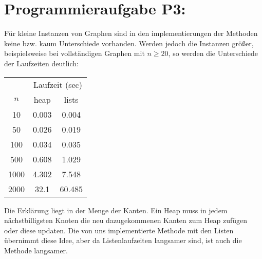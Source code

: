 \documentclass[11pt]{scrartcl} %
\begin{document}
\section*{Programmieraufgabe P3:}
Für kleine Instanzen von Graphen sind in den implementierungen der Methoden keine bzw. kaum Unterschiede vorhanden. Werden jedoch die Instanzen größer, beispielsweise bei vollständigen Graphen mit $n \geq 20$, so werden die Unterschiede der Laufzeiten deutlich:

\begin{minipage}[b]{0.3\textwidth}
\begin{tabular}{c|c|c}
 & \multicolumn{2}{c}{Laufzeit (sec)}\\
$n$ & heap & lists\\
\hline \hline
10 & 0.003 & 0.004 \\
\hline
50 & 0.026 & 0.019 \\ 
\hline
100 & 0.034 & 0.035 \\
\hline
500 & 0.608 & 1.029 \\
\hline
1000 & 4.302 & 7.548\\
\hline
2000 & 32.1 & 60.485\\
\hline
\end{tabular}   
\end{minipage}
\begin{minipage}[b]{0.7\textwidth}
Die Erklärung liegt in der Menge der Kanten. Ein Heap muss in jedem nächstbilligsten Knoten die neu dazugekommenen Kanten zum Heap zufügen oder diese updaten. Die von uns implementierte Methode mit den Listen übernimmt diese Idee, aber da Listenlaufzeiten langsamer sind, ist auch die Methode langsamer.
\end{minipage}
\end{document}
